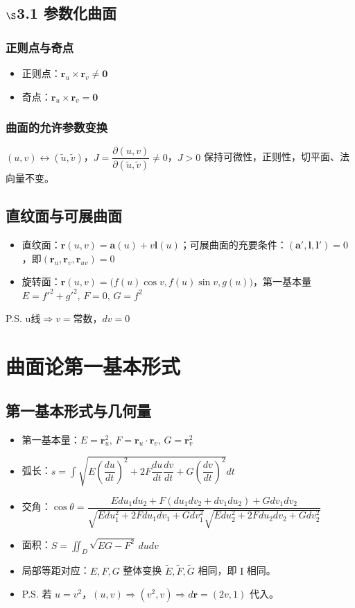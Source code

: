 \documentclass{article}
\begin{document}
	\subsection{$\S$3.1 参数化曲面}
	\subsubsection{正则点与奇点}
	\begin{itemize}
		\item 正则点：$\boldsymbol{r}_u\times\boldsymbol{r}_v\neq\boldsymbol{0}$
		\item 奇点：$\boldsymbol{r}_u\times\boldsymbol{r}_v=\boldsymbol{0}$
	\end{itemize}
	\subsubsection{曲面的允许参数变换}
	$(u,v)\leftrightarrow(\tilde{u},\tilde{v})$，$J=\dfrac{\partial(u,v)}{\partial(\tilde{u},\tilde{v})}\neq0$，$J>0$ 保持可微性，正则性，切平面、法向量不变。
	
	\subsection{直纹面与可展曲面}
	\begin{itemize}
		\item 直纹面：$\boldsymbol{r}(u,v)=\boldsymbol{a}(u)+v\boldsymbol{l}(u)$；可展曲面的充要条件：$(\boldsymbol{a}',\boldsymbol{l},\boldsymbol{l}')=0$，即$(\boldsymbol{r}_u,\boldsymbol{r}_v,\boldsymbol{r}_{uv})=0$
		\item 旋转面：$\boldsymbol{r}(u,v)=\big(f(u)\cos v,f(u)\sin v,g(u)\big)$，第一基本量$E=f'^2+g'^2,\,F=0,\,G=f^2$
	\end{itemize}
	P.S. u线$\Rightarrow v=$常数，$dv=0$
	
	\section{曲面论第一基本形式}
	\subsection{第一基本形式与几何量}
	\begin{itemize}
		\item 第一基本量：$E=\boldsymbol{r}_u^2,\,F=\boldsymbol{r}_u\cdot\boldsymbol{r}_v,\,G=\boldsymbol{r}_v^2$
		\item 弧长：$s=\int\sqrt{E\left(\dfrac{du}{dt}\right)^2+2F\dfrac{du}{dt}\dfrac{dv}{dt}+G\left(\dfrac{dv}{dt}\right)^2}dt$
		\item 交角：$\cos\theta=\dfrac{Edu_1du_2+F(du_1dv_2+dv_1du_2)+Gdv_1dv_2}{\sqrt{Edu_1^2+2Fdu_1dv_1+Gdv_1^2}\sqrt{Edu_2^2+2Fdu_2dv_2+Gdv_2^2}}$
		\item 面积：$S=\iint_D\sqrt{EG-F^2}\,dudv$
		\item 局部等距对应：$E,F,G$ 整体变换 $\tilde{E},\tilde{F},\tilde{G}$ 相同，即 $\mathrm{I}$ 相同。
		\item P.S. 若 $u=v^2$，$(u,v)\Rightarrow(v^2,v)\Rightarrow d\boldsymbol{r}=(2v,1)$ 代入。
	\end{itemize}
	
\end{document}
